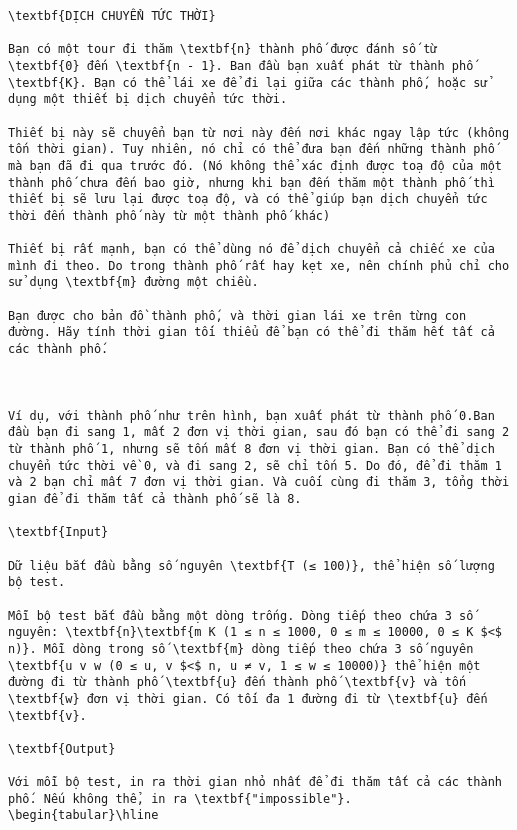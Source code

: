 
\begin{verbatim}



\textbf{DỊCH CHUYỂN TỨC THỜI}

Bạn có một tour đi thăm \textbf{n} thành phố được đánh số từ \textbf{0} đến \textbf{n - 1}. Ban đầu bạn xuất phát từ thành phố \textbf{K}. Bạn có thể lái xe để đi lại giữa các thành phố, hoặc sử dụng một thiết bị dịch chuyển tức thời.

Thiết bị này sẽ chuyển bạn từ nơi này đến nơi khác ngay lập tức (không tốn thời gian). Tuy nhiên, nó chỉ có thể đưa bạn đến những thành phố mà bạn đã đi qua trước đó. (Nó không thể xác định được toạ độ của một thành phố chưa đến bao giờ, nhưng khi bạn đến thăm một thành phố thì thiết bị sẽ lưu lại được toạ độ, và có thể giúp bạn dịch chuyển tức thời đến thành phố này từ một thành phố khác)

Thiết bị rất mạnh, bạn có thể dùng nó để dịch chuyển cả chiếc xe của mình đi theo. Do trong thành phố rất hay kẹt xe, nên chính phủ chỉ cho sử dụng \textbf{m} đường một chiều.

Bạn được cho bản đồ thành phố, và thời gian lái xe trên từng con đường. Hãy tính thời gian tối thiểu để bạn có thể đi thăm hết tất cả các thành phố.

 

Ví dụ, với thành phố như trên hình, bạn xuất phát từ thành phố 0.Ban đầu bạn đi sang 1, mất 2 đơn vị thời gian, sau đó bạn có thể đi sang 2 từ thành phố 1, nhưng sẽ tốn mất 8 đơn vị thời gian. Bạn có thể dịch chuyển tức thời về 0, và đi sang 2, sẽ chỉ tốn 5. Do đó, để đi thăm 1 và 2 bạn chỉ mất 7 đơn vị thời gian. Và cuối cùng đi thăm 3, tổng thời gian để đi thăm tất cả thành phố sẽ là 8.

\textbf{Input}

Dữ liệu bắt đầu bằng số nguyên \textbf{T (≤ 100)}, thể hiện số lượng bộ test.

Mỗi bộ test bắt đầu bằng một dòng trống. Dòng tiếp theo chứa 3 số nguyên: \textbf{n}\textbf{m K (1 ≤ n ≤ 1000, 0 ≤ m ≤ 10000, 0 ≤ K $<$ n)}. Mỗi dòng trong số \textbf{m} dòng tiếp theo chứa 3 số nguyên \textbf{u v w (0 ≤ u, v $<$ n, u ≠ v, 1 ≤ w ≤ 10000)} thể hiện một đường đi từ thành phố \textbf{u} đến thành phố \textbf{v} và tốn \textbf{w} đơn vị thời gian. Có tối đa 1 đường đi từ \textbf{u} đến \textbf{v}.

\textbf{Output}

Với mỗi bộ test, in ra thời gian nhỏ nhất để đi thăm tất cả các thành phố. Nếu không thể, in ra \textbf{"impossible"}.
\begin{tabular}\hline 



\end{verbatim}
